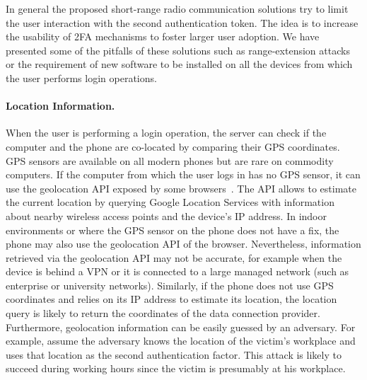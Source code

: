 In general the proposed short-range radio communication solutions try to limit the user interaction with the second authentication token. The idea is to increase the usability of 2FA mechanisms to foster larger user adoption. We have presented some of the pitfalls of these solutions such as range-extension attacks or the requirement of new software to be installed on all the devices from which the user performs login operations.

\paragraph{Location Information.}
When the user is performing a login operation, the server can check if the computer and the phone are co-located by comparing their GPS coordinates.
GPS sensors are available on all modern phones but are rare on commodity computers.
If the computer from which the user logs in has no GPS sensor, it can use the geolocation API exposed by some browsers~\cite{firefoxgeolocation}.
The API allows to estimate the current location by querying Google Location Services with information about nearby wireless access points and the device's IP address.
In indoor environments or where the GPS sensor on the phone does not have a fix, the phone may also use the geolocation API of the browser.
Nevertheless, information retrieved via the geolocation API may not be accurate, for example when the device is behind a VPN or it is connected to a large managed network (such as enterprise or university networks). Similarly, if the phone does not use GPS coordinates and relies on its IP address to estimate its location, the location query is likely to return the coordinates of the data connection provider.
Furthermore, geolocation information can be easily guessed by an adversary.
For example, assume the adversary knows the location of the victim's workplace and uses that location as the second authentication factor.
This attack is likely to succeed during working hours since the victim is presumably at his workplace.

